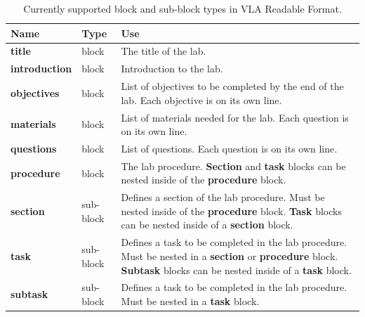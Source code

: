 \documentclass[11.5pt]{sig-alternate} %
\begin{document}
\begin{large}
\begin{table}[th]
\caption{Currently supported block and sub-block types in VLA Readable Format.}
\begin{tabular}{|l|l|l|}
\hline
\textbf{Name} & \textbf{Type} & \textbf{Use} \\ \hline
\textbf{title} & block & The title of the lab. \\ \hline
\textbf{introduction} & block & Introduction to the lab. \\ \hline
\textbf{objectives} & block & List of objectives to be completed by the end of the lab. Each objective is on its own line. \\ \hline
\textbf{materials} & block & List of materials needed for the lab. Each question is on its own line. \\ \hline
\textbf{questions} & block & List of questions. Each question is on its own line. \\ \hline
\textbf{procedure} & block & The lab procedure. \textbf{Section} and \textbf{task} blocks can be nested inside of the \textbf{procedure} block. \\ \hline
\textbf{section} & sub-block & Defines a section of the lab procedure. Must be nested inside of the \textbf{procedure} block. \textbf{Task} blocks can be nested inside of a \textbf{section} block. \\ \hline
\textbf{task} & sub-block & Defines a task to be completed in the lab procedure. Must be nested in a \textbf{section} or \textbf{procedure} block. \textbf{Subtask} blocks can be nested inside of a \textbf{task} block.  \\ \hline
\textbf{subtask} & sub-block & Defines a task to be completed in the lab procedure. Must be nested in a \textbf{task} block. \\ \hline
\end{tabular}
\end{table}


\end{large}
\end{document}
